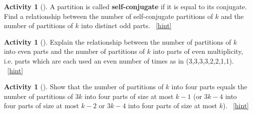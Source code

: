\documentclass[10pt,]{book}
\newcommand{\terminology}[1]{\textbf{#1}}
\theoremstyle{plain}
\theoremstyle{definition}
\theoremstyle{definition}
\theoremstyle{definition}
\newtheorem{activity}[project]{Activity}
\numberwithin{equation}{chapter}
\begin{document}
\begin{activity}[]\label{activity-243}
\hypertarget{p-1097}{}%
A partition is called \terminology{self-conjugate} if it is equal to its conjugate. Find a relationship between the number of self-conjugate partitions of \(k\) and the number of partitions of \(k\) into distinct odd parts.%
~\hfill{\tiny\hyperlink{a-243}{[hint]}\hypertarget{q-243}{}}\end{activity}
\begin{activity}[]\label{partition-even-mult-even-use}
\hypertarget{p-1101}{}%
Explain the relationship between the number of partitions of \(k\) into even parts and the number of partitions of \(k\) into parts of even multiplicity, i.e. parts which are each used an even number of times as in (3,3,3,3,2,2,1,1).%
~\hfill{\tiny\hyperlink{a-244}{[hint]}\hypertarget{q-244}{}}\end{activity}
\begin{activity}[]\label{rectanglecomplement}
\hypertarget{p-1104}{}%
Show that the number of partitions of \(k\) into four parts equals the number of partitions of \(3k\) into four parts of size at most \(k-1\) (or \(3k-4\) into four parts of size at most \(k-2\) or \(3k-4\) into four parts of size at most \(k\)).%
~\hfill{\tiny\hyperlink{a-245}{[hint]}\hypertarget{q-245}{}}\end{activity}
\end{document}
